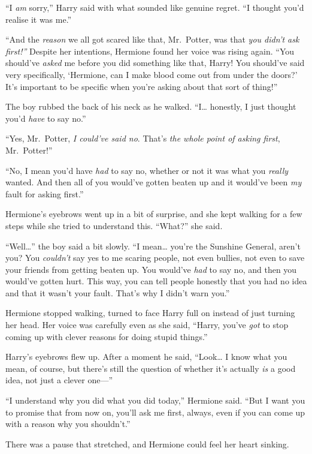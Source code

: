 ``I \emph{am} sorry,'' Harry said with what sounded like genuine regret.
``I thought you'd realise it was me.''

``And the \emph{reason} we all got scared like that, Mr.~Potter, was
that \emph{you didn't ask first!''} Despite her intentions, Hermione
found her voice was rising again. ``You should've \emph{asked} me before
you did something like that, Harry! You should've said very
specifically, `Hermione, can I make blood come out from under the
doors?' It's important to be specific when you're asking about that sort
of thing!''

The boy rubbed the back of his neck as he walked. ``I\ldots{} honestly,
I just thought you'd \emph{have} to say no.''

``Yes, Mr.~Potter, \emph{I could've said no}. That's \emph{the whole
point of asking first}, Mr.~Potter!''

``No, I mean you'd have \emph{had} to say no, whether or not it was what
you \emph{really} wanted. And then all of you would've gotten beaten up
and it would've been \emph{my} fault for asking first.''

Hermione's eyebrows went up in a bit of surprise, and she kept walking
for a few steps while she tried to understand this. ``What?'' she said.

``Well\ldots{}'' the boy said a bit slowly. ``I mean\ldots{} you're the
Sunshine General, aren't you? You \emph{couldn't} say yes to me scaring
people, not even bullies, not even to save your friends from getting
beaten up. You would've \emph{had} to say no, and then you would've
gotten hurt. This way, you can tell people honestly that you had no idea
and that it wasn't your fault. That's why I didn't warn you.''

Hermione stopped walking, turned to face Harry full on instead of just
turning her head. Her voice was carefully even as she said, ``Harry,
you've \emph{got} to stop coming up with clever reasons for doing stupid
things.''

Harry's eyebrows flew up. After a moment he said, ``Look\ldots{} I know
what you mean, of course, but there's still the question of whether it's
actually \emph{is} a good idea, not just a clever one---''

``I understand why you did what you did today,'' Hermione said. ``But I
want you to promise that from now on, you'll ask me first, always, even
if you can come up with a reason why you shouldn't.''

There was a pause that stretched, and Hermione could feel her heart
sinking.

